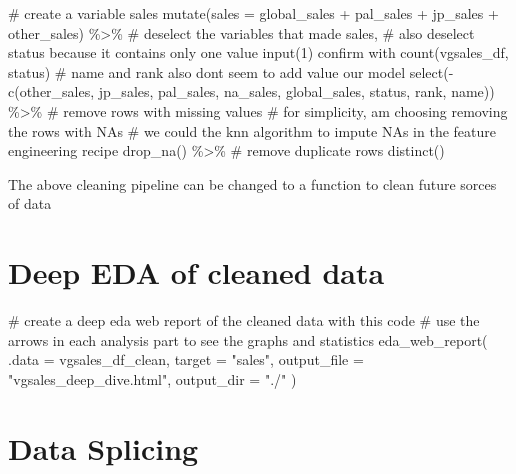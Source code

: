 \documentclass[
  letterpaper,
  DIV=11,
  numbers=noendperiod]{scrartcl}
\newenvironment{Shaded}{\begin{snugshade}}{\end{snugshade}}
\newcommand{\AttributeTok}[1]{\textcolor[rgb]{0.40,0.45,0.13}{#1}}
\newcommand{\CommentTok}[1]{\textcolor[rgb]{0.37,0.37,0.37}{#1}}
\newcommand{\FunctionTok}[1]{\textcolor[rgb]{0.28,0.35,0.67}{#1}}
\newcommand{\NormalTok}[1]{\textcolor[rgb]{0.00,0.23,0.31}{#1}}
\newcommand{\SpecialCharTok}[1]{\textcolor[rgb]{0.37,0.37,0.37}{#1}}
\newcommand{\StringTok}[1]{\textcolor[rgb]{0.13,0.47,0.30}{#1}}
\begin{document}
\begin{Shaded}
\begin{Highlighting}[]
  \CommentTok{\# create a variable sales}
  \FunctionTok{mutate}\NormalTok{(}\AttributeTok{sales =}\NormalTok{ global\_sales }\SpecialCharTok{+}\NormalTok{ pal\_sales }\SpecialCharTok{+}\NormalTok{ jp\_sales }\SpecialCharTok{+}\NormalTok{ other\_sales) }\SpecialCharTok{\%\textgreater{}\%} 
  \CommentTok{\# deselect the variables that made sales, }
  \CommentTok{\# also deselect status because it contains only one value input(1) confirm with \textasciigrave{}count(vgsales\_df, status)\textasciigrave{}}
  \CommentTok{\# name and rank also dont seem to add value our model}
  \FunctionTok{select}\NormalTok{(}\SpecialCharTok{{-}}\FunctionTok{c}\NormalTok{(other\_sales, jp\_sales, pal\_sales, na\_sales, global\_sales, status, rank, name)) }\SpecialCharTok{\%\textgreater{}\%} 
  \CommentTok{\# remove rows with missing values }
  \CommentTok{\# for simplicity, am choosing removing the rows with NA\textquotesingle{}s}
  \CommentTok{\# we could the knn algorithm to impute NA\textquotesingle{}s in the feature engineering recipe}
  \FunctionTok{drop\_na}\NormalTok{() }\SpecialCharTok{\%\textgreater{}\%} 
   \CommentTok{\# remove duplicate rows}
  \FunctionTok{distinct}\NormalTok{()}
\end{Highlighting}
\end{Shaded}

The above cleaning pipeline can be changed to a function to clean future
sorces of data

\hypertarget{deep-eda-of-cleaned-data}{%
\section{Deep EDA of cleaned data}\label{deep-eda-of-cleaned-data}}

\begin{Shaded}
\begin{Highlighting}[]
\CommentTok{\# create a deep eda web report of the cleaned data with this code}
\CommentTok{\# use the arrows in each analysis part to see the graphs and statistics}
\FunctionTok{eda\_web\_report}\NormalTok{(}
  \AttributeTok{.data =}\NormalTok{ vgsales\_df\_clean, }
  \AttributeTok{target =} \StringTok{"sales"}\NormalTok{, }
  \AttributeTok{output\_file =} \StringTok{"vgsales\_deep\_dive.html"}\NormalTok{, }
  \AttributeTok{output\_dir =} \StringTok{"./"}
\NormalTok{)}
\end{Highlighting}
\end{Shaded}

\hypertarget{data-splicing}{%
\section{Data Splicing}\label{data-splicing}}
\end{document}
